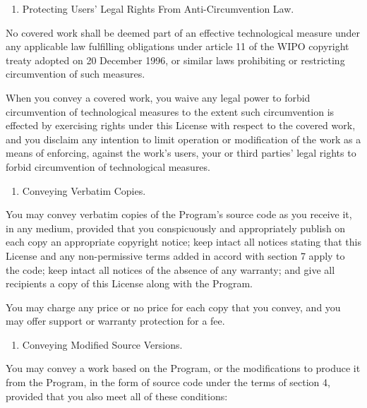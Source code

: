 \documentclass[11pt]{article}
\begin{document}
\begin{enumerate}
\item Protecting Users' Legal Rights From Anti-Circumvention Law.
\end{enumerate}
No covered work shall be deemed part of an effective technological measure under any applicable law fulfilling obligations under article 11 of the WIPO copyright treaty adopted on 20 December 1996, or similar laws prohibiting or restricting circumvention of such measures.

When you convey a covered work, you waive any legal power to forbid circumvention of technological measures to the extent such circumvention is effected by exercising rights under this License with respect to the covered work, and you disclaim any intention to limit operation or modification of the work as a means of enforcing, against the work's users, your or third parties' legal rights to forbid circumvention of technological measures.

\begin{enumerate}
\item Conveying Verbatim Copies.
\end{enumerate}
You may convey verbatim copies of the Program's source code as you receive it, in any medium, provided that you conspicuously and appropriately publish on each copy an appropriate copyright notice; keep intact all notices stating that this License and any non-permissive terms added in accord with section 7 apply to the code; keep intact all notices of the absence of any warranty; and give all recipients a copy of this License along with the Program.

You may charge any price or no price for each copy that you convey, and you may offer support or warranty protection for a fee.

\begin{enumerate}
\item Conveying Modified Source Versions.
\end{enumerate}
You may convey a work based on the Program, or the modifications to produce it from the Program, in the form of source code under the terms of section 4, provided that you also meet all of these conditions:
\end{document}
